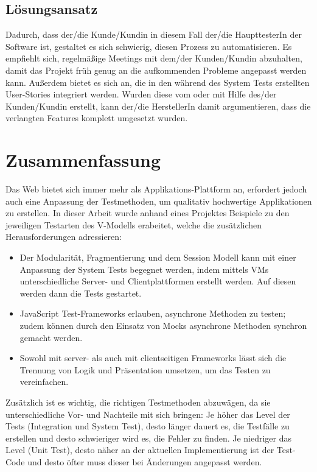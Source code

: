 \documentclass[a4paper,bibtotoc,oneside]{scrbook}
\begin{document}
\section{Lösungsansatz}
Dadurch, dass der/die Kunde/Kundin in diesem Fall der/die HaupttesterIn der Software ist, gestaltet es sich schwierig, diesen Prozess zu automatisieren. Es empfiehlt sich, regelmäßige Meetings mit dem/der Kunden/Kundin abzuhalten, damit das Projekt früh genug an die aufkommenden Probleme angepasst werden kann. Außerdem bietet es sich an, die in den während des System Tests erstellten User-Stories integriert werden. Wurden diese vom oder mit Hilfe des/der Kunden/Kundin erstellt, kann der/die HerstellerIn damit argumentieren, dass die verlangten Features komplett umgesetzt wurden.


\chapter{Zusammenfassung}
Das Web bietet sich immer mehr als Applikations-Plattform an, erfordert jedoch auch eine Anpassung der Testmethoden, um qualitativ hochwertige Applikationen zu erstellen. In dieser Arbeit wurde anhand eines Projektes Beispiele zu den jeweiligen Testarten des V-Modells erabeitet, welche die zusätzlichen Herausforderungen adressieren:

\begin{itemize}
  \item Der Modularität, Fragmentierung und dem Session Modell kann mit einer Anpassung der System Tests begegnet werden, indem mittels VMs unterschiedliche Server- und Clientplattformen erstellt werden. Auf diesen werden dann die Tests gestartet.
  \item JavaScript Test-Frameworks erlauben, asynchrone Methoden zu testen; zudem können durch den Einsatz von Mocks asynchrone Methoden synchron gemacht werden.
  \item Sowohl mit server- als auch mit clientseitigen Frameworks lässt sich die Trennung von Logik und Präsentation umsetzen, um das Testen zu vereinfachen.
\end{itemize}

Zusätzlich ist es wichtig, die richtigen Testmethoden abzuwägen, da sie unterschiedliche Vor- und Nachteile mit sich bringen: Je höher das Level der Tests (Integration und System Test), desto länger dauert es, die Testfälle zu erstellen und desto schwieriger wird es, die Fehler zu finden. Je niedriger das Level (Unit Test), desto näher an der aktuellen Implementierung ist der Test-Code und desto öfter muss dieser bei Änderungen angepasst werden.
\end{document}
